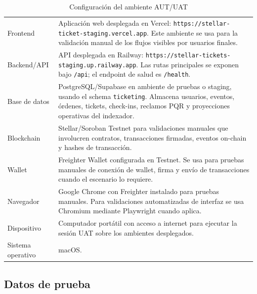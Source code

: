 \documentclass[12pt,letterpaper]{article}
\begin{document}
\begin{table}[H]
\centering
\begingroup
\footnotesize
\setlength{\tabcolsep}{3pt}
\renewcommand{\arraystretch}{1.25}

\begin{tabularx}{\textwidth}{|
>{\raggedright\arraybackslash}p{3.5cm}|
>{\raggedright\arraybackslash}X|}
\hline
\multicolumn{1}{|>{\centering\arraybackslash}m{3.5cm}|}{\textbf{Elemento}} &
\multicolumn{1}{>{\centering\arraybackslash}m{10.7cm}|}{\textbf{Descripción}} \\
\hline
Frontend & Aplicación web desplegada en Vercel: \texttt{https://stellar-ticket-staging.vercel.app}. Este ambiente se usa para la validación manual de los flujos visibles por usuarios finales. \\
\hline
Backend/API & API desplegada en Railway: \texttt{https://stellar-tickets-staging.up.railway.app}. Las rutas principales se exponen bajo \texttt{/api}; el endpoint de salud es \texttt{/health}. \\
\hline
Base de datos & PostgreSQL/Supabase en ambiente de pruebas o staging, usando el schema \texttt{ticketing}. Almacena usuarios, eventos, órdenes, tickets, check-ins, reclamos PQR y proyecciones operativas del indexador. \\
\hline
Blockchain & Stellar/Soroban Testnet para validaciones manuales que involucren contratos, transacciones firmadas, eventos on-chain y hashes de transacción. \\
\hline
Wallet & Freighter Wallet configurada en Testnet. Se usa para pruebas manuales de conexión de wallet, firma y envío de transacciones cuando el escenario lo requiere. \\
\hline
Navegador & Google Chrome con Freighter instalado para pruebas manuales. Para validaciones automatizadas de interfaz se usa Chromium mediante Playwright cuando aplica. \\
\hline
Dispositivo & Computador portátil con acceso a internet para ejecutar la sesión UAT sobre los ambientes desplegados. \\
\hline
Sistema operativo & macOS. \\
\hline
\end{tabularx}

\endgroup
\caption{Configuración del ambiente AUT/UAT}
\label{tab:configuracion-ambiente-uat}
\end{table}

\subsection{Datos de prueba}
\end{document}
